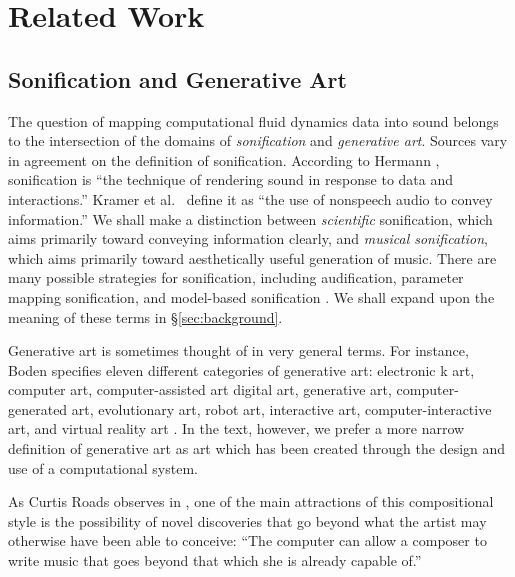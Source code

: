 \chapter[Related Work]{Related Work}
\label{chap:chap2}
\section{Sonification and Generative Art}

The question of mapping computational fluid dynamics data into sound belongs 
to the intersection of the domains of {\em sonification} and {\em generative 
art}. Sources vary in agreement on the definition of sonification. According 
to Hermann \cite{hermann2011sonification}, sonification is ``the technique of rendering sound in response to 
data and interactions.''  Kramer et al.~ \cite{kramer2010sonification} define 
it as ``the use of nonspeech audio to convey information.''
We shall make a distinction between {\em scientific} 
sonification, which aims primarily toward conveying information clearly, and {\em musical sonification}, which aims primarily toward aesthetically useful 
generation of music. There are many possible strategies for sonification, 
including audification, parameter mapping sonification, and model-based 
sonification \cite{hermann2011sonification}. We shall expand upon the meaning 
of these terms in \S\ref{sec:background}.

Generative art is sometimes thought of in very general terms. For instance, 
Boden specifies eleven different categories of generative art: electronic k
art, computer art, computer-assisted art digital art, generative art, computer-generated art, evolutionary art, robot art, interactive art, computer-interactive art, and virtual reality art \cite{boden2009generative}. In the 
text, however, we prefer a more narrow definition of generative art as art 
which has been created through the design and use of a computational system.

As Curtis Roads observes in \cite{roads2015composing}, one of the main attractions of this compositional style is the possibility of 
novel discoveries that go beyond what the artist may otherwise have been able 
to conceive: ``The computer can allow a composer to write music that goes 
beyond that which she is already capable of.'' 

